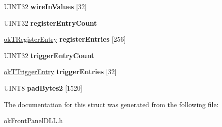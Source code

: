 \begin{DoxyCompactItemize}
\item 
\hypertarget{structokTFPGAResetProfile_a054384dfb5e73708f02e1bd608a40f50}{U\+I\+N\+T32 {\bfseries wire\+In\+Values} \mbox{[}32\mbox{]}}\label{structokTFPGAResetProfile_a054384dfb5e73708f02e1bd608a40f50}

\item 
\hypertarget{structokTFPGAResetProfile_ac417250b94875f905aff72b50abd98dc}{U\+I\+N\+T32 {\bfseries register\+Entry\+Count}}\label{structokTFPGAResetProfile_ac417250b94875f905aff72b50abd98dc}

\item 
\hypertarget{structokTFPGAResetProfile_a60d29b2a19accd1ee65b9efda5918fee}{\hyperlink{structokTRegisterEntry}{ok\+T\+Register\+Entry} {\bfseries register\+Entries} \mbox{[}256\mbox{]}}\label{structokTFPGAResetProfile_a60d29b2a19accd1ee65b9efda5918fee}

\item 
\hypertarget{structokTFPGAResetProfile_af978c243182da9d44a112295ef1245c9}{U\+I\+N\+T32 {\bfseries trigger\+Entry\+Count}}\label{structokTFPGAResetProfile_af978c243182da9d44a112295ef1245c9}

\item 
\hypertarget{structokTFPGAResetProfile_a03f5e353c4da15a5f2368552687756d7}{\hyperlink{structokTTriggerEntry}{ok\+T\+Trigger\+Entry} {\bfseries trigger\+Entries} \mbox{[}32\mbox{]}}\label{structokTFPGAResetProfile_a03f5e353c4da15a5f2368552687756d7}

\item 
\hypertarget{structokTFPGAResetProfile_aea40bb955586affa4179e618acdd7cee}{U\+I\+N\+T8 {\bfseries pad\+Bytes2} \mbox{[}1520\mbox{]}}\label{structokTFPGAResetProfile_aea40bb955586affa4179e618acdd7cee}

\end{DoxyCompactItemize}


The documentation for this struct was generated from the following file\+:\begin{DoxyCompactItemize}
\item 
ok\+Front\+Panel\+D\+L\+L.\+h\end{DoxyCompactItemize}
